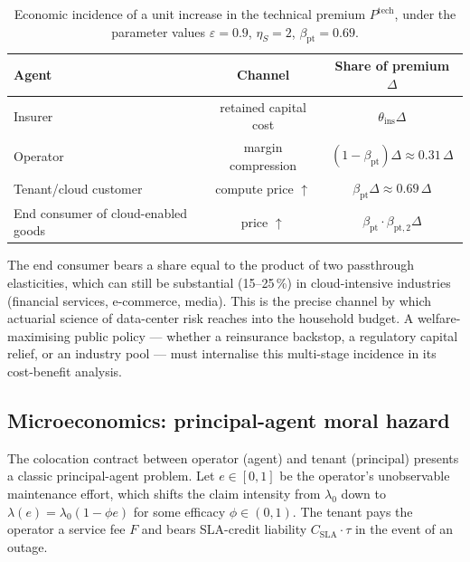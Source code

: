 \begin{table}[ht]
\centering\small
\caption{Economic incidence of a unit increase in the technical
premium $P^{\mathrm{tech}}$, under the parameter values
$\varepsilon=0.9$, $\eta_S=2$, $\beta_{\mathrm{pt}}=0.69$.}\label{tab:incidence}
\begin{tabular}{lcc}
\toprule
Agent & Channel & Share of premium $\Delta$ \\
\midrule
Insurer & retained capital cost     & $\theta_{\mathrm{ins}}\Delta$ \\
Operator & margin compression         & $(1-\beta_{\mathrm{pt}})\Delta\approx 0.31\,\Delta$ \\
Tenant/cloud customer & compute price $\uparrow$ & $\beta_{\mathrm{pt}}\Delta\approx 0.69\,\Delta$ \\
End consumer of cloud-enabled goods & price $\uparrow$ & $\beta_{\mathrm{pt}}\cdot\beta_{\mathrm{pt,2}}\Delta$ \\
\bottomrule
\end{tabular}
\end{table}

\noindent The end consumer bears a share equal to the product of two
passthrough elasticities, which can still be substantial (15--25\,\%)
in cloud-intensive industries (financial services, e-commerce, media).
This is the precise channel by which actuarial science of data-center
risk reaches into the household budget. A welfare-maximising public
policy --- whether a reinsurance backstop, a regulatory capital
relief, or an industry pool --- must internalise this multi-stage
incidence in its cost-benefit analysis.

\subsection{Microeconomics: principal-agent moral hazard}\label{ss:moral}

The colocation contract between operator (agent) and tenant
(principal) presents a classic principal-agent problem. Let
$e\in[0,1]$ be the operator's unobservable maintenance effort, which
shifts the claim intensity from $\lambda_0$ down to
$\lambda(e)=\lambda_0(1-\phi e)$ for some efficacy $\phi\in(0,1)$. The
tenant pays the operator a service fee $F$ and bears SLA-credit
liability $C_{\mathrm{SLA}}\cdot\tau$ in the event of an outage.

